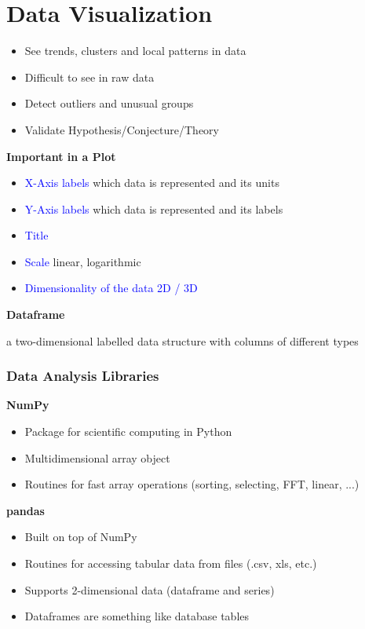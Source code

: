 \section{Data Visualization}
\begin{itemize}
    \item See trends, clusters and local patterns in data
    \item Difficult to see in raw data
    \item Detect outliers and unusual groups
    \item Validate Hypothesis/Conjecture/Theory
\end{itemize}
\vspace{10pt}
\textbf{Important in a Plot}
\begin{itemize}
    \item \textcolor{blue}{X-Axis labels} which data is represented and its units
    \item \textcolor{blue}{Y-Axis labels} which data is represented and its labels
    \item \textcolor{blue}{Title}
    \item \textcolor{blue}{Scale} linear, logarithmic
    \item \textcolor{blue}{Dimensionality of the data 2D / 3D}
\end{itemize}
\vspace{10pt}
\textbf{Dataframe}

a two-dimensional labelled data structure with columns of different types

\subsubsection{Data Analysis Libraries}
\textbf{NumPy}
\begin{itemize}
    \item Package for scientific computing in Python
    \item Multidimensional array object
    \item Routines for fast array operations (sorting, selecting, FFT, linear, ...)
\end{itemize}

\textbf{pandas}
\begin{itemize}
    \item Built on top of NumPy
    \item Routines for accessing tabular data from files (.csv, xls, etc.)
    \item Supports 2-dimensional data (dataframe and series)
    \item Dataframes are something like database tables
\end{itemize}

